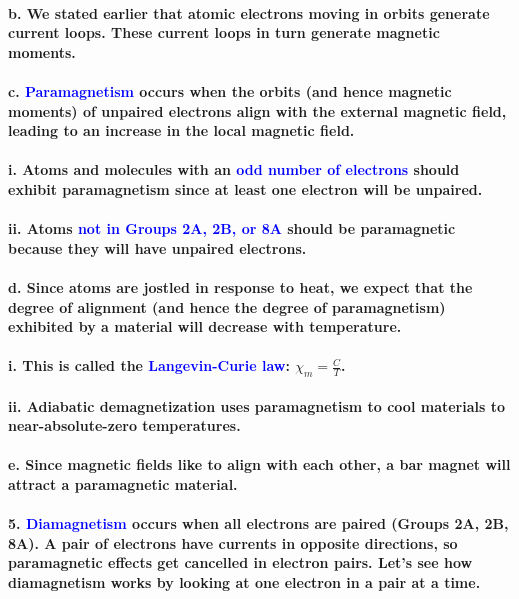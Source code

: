 \documentclass{article}
\begin{document}
\paragraph{\indent b. We stated earlier that atomic electrons moving in orbits generate current loops. These current loops in turn generate magnetic moments.}
\paragraph{\indent c. \textcolor{blue}{Paramagnetism} occurs when the orbits (and hence magnetic moments) of unpaired electrons align with the external magnetic field, leading to an increase in the local magnetic field.}
\paragraph{\indent\indent i. Atoms and molecules with an \textcolor{blue}{odd number of electrons} should exhibit paramagnetism since at least one electron will be unpaired.}
\paragraph{\indent\indent ii. Atoms \textcolor{blue}{not in Groups 2A, 2B, or 8A} should be paramagnetic because they will have unpaired electrons.}
\paragraph{\indent d. Since atoms are jostled in response to heat, we expect that the degree of alignment (and hence the degree of paramagnetism) exhibited by a material will decrease with temperature.}
\paragraph{\indent\indent i. This is called the \textcolor{blue}{Langevin-Curie law}: $\chi_m=\frac{C}{T}$.}
\paragraph{\indent\indent ii. Adiabatic demagnetization uses paramagnetism to cool materials to near-absolute-zero temperatures.}
\paragraph{\indent e. Since magnetic fields like to align with each other, a bar magnet will attract a paramagnetic material.}
\paragraph{5. \textcolor{blue}{Diamagnetism} occurs when all electrons are paired (Groups 2A, 2B, 8A). A pair of electrons have currents in opposite directions, so paramagnetic effects get cancelled in electron pairs. Let's see how diamagnetism works by looking at one electron in a pair at a time.}
\end{document}
